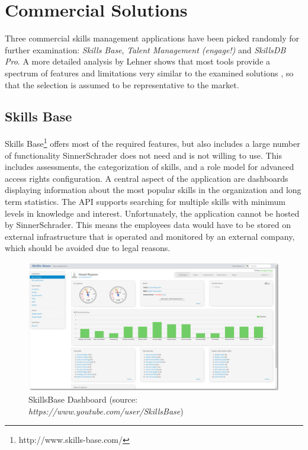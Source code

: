 \section{Commercial Solutions}
\label{commercial}
Three commercial skills management applications have been picked randomly for further examination: \textit{Skills Base}, \textit{Talent Management (engage!)} and \textit{SkillsDB Pro}.
A more detailed analysis by Lehner shows that most tools provide a spectrum of features and limitations very similar to the examined solutions \cite{Marktanalyse}, so that the selection is assumed to be representative to the market.

\subsection{Skills Base}
Skills Base\footnote{http://www.skills-base.com/} offers most of the required features, but also includes a large number of functionality SinnerSchrader does not need and is not willing to use. This includes assessments, the categorization of skills, and a role model for advanced access rights configuration.
A central aspect of the application are dashboards displaying information about the most popular skills in the organization and long term statistics. The API supports searching for multiple skills with minimum levels in knowledge and interest. Unfortunately, the application cannot be hosted by SinnerSchrader. This means the employees data would have to be stored on external infrastructure that is operated and monitored by an external company, which should be avoided due to legal reasons.
\begin{figure}[!htp]
    \centering
    \includegraphics[width=\textwidth]{images/skillsbase-dashboard.png}
    \caption[Screenshot: SkillsBase Dashboard]{SkillsBase Dashboard (source: \textit{https://www.youtube.com/user/SkillsBase})}
    \label{fig:skillsbase_dashboard}
\end{figure}

